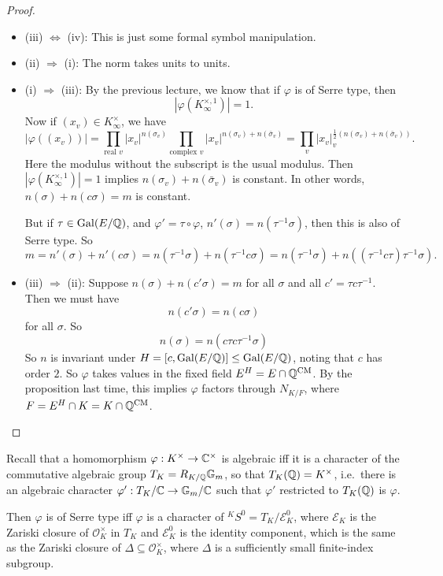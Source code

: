 \documentclass[a4paper]{article}
\renewcommand\G{\mathbb{G}}
\newcommand\CM{\mathrm{CM}}
\begin{document}
\begin{proof}\leavevmode
  \begin{itemize}
    \item (iii) $\Leftrightarrow$ (iv): This is just some formal symbol manipulation.
    \item (ii) $\Rightarrow$ (i): The norm takes units to units.
    \item (i) $\Rightarrow$ (iii): By the previous lecture, we know that if $\varphi$ is of Serre type, then
      \[
        |\varphi(K_\infty^{\times, 1})| = 1.
      \]
      Now if $(x_v) \in K_\infty^\times$, we have
      \[
        |\varphi((x_v))| = \prod_{\text{real }v} |x_v|^{n(\sigma_v)} \prod_{\text{complex }v} |x_v|^{n(\sigma_v) + n(\bar{\sigma}_v)} = \prod_v |x_v|_v^{\frac{1}{2} (n(\sigma_v) + n(\bar{\sigma}_v))}.
      \]
      Here the modulus without the subscript is the usual modulus. Then $|\varphi(K_\infty^{\times, 1})| = 1$ implies $n(\sigma_v) + n(\bar{\sigma}_v)$ is constant. In other words, $n(\sigma) + n(c\sigma) = m$ is constant.

      But if $\tau \in \operatorname{Gal}(E/\mathbb{Q})$, and $\varphi' = \tau \circ \varphi$, $n'(\sigma) = n(\tau^{-1}\sigma)$, then this is also of Serre type. So
      \[
        m = n'(\sigma) + n'(c\sigma) = n(\tau^{-1} \sigma) + n(\tau^{-1} c \sigma) = n(\tau^{-1} \sigma) + n((\tau^{-1} c \tau) \tau^{-1} \sigma).
      \]
    \item (iii) $\Rightarrow$ (ii): Suppose $n(\sigma) + n(c'\sigma) = m$ for all $\sigma$ and all $c' = \tau c \tau^{-1}$. Then we must have
      \[
        n(c'\sigma) = n(c\sigma)
      \]
      for all $\sigma$. So
      \[
        n(\sigma) = n(c\tau c \tau^{-1} \sigma)
      \]
      So $n$ is invariant under $H = [c, \operatorname{Gal}(E/\mathbb{Q})] \leq \operatorname{Gal}(E/\mathbb{Q})$, noting that $c$ has order $2$. So $\varphi$ takes values in the fixed field $E^H = E \cap \Q^{\CM}$. By the proposition last time, this implies $\varphi$ factors through $N_{K/F}$, where $F = E^H \cap K = K \cap \Q^{\CM}$.\qedhere
  \end{itemize}
\end{proof}
Recall that a homomorphism $\varphi: K^\times \to \mathbb{C}^\times$ is algebraic iff it is a character of the commutative algebraic group $T_K = R_{K/\Q} \G_m$, so that $T_K(\mathbb{Q}) = K^\times$, i.e.\ there is an algebraic character $\varphi': T_K/\C \to \G_m/\C$ such that $\varphi'$ restricted to $T_K(\mathbb{Q})$ is $\varphi$.

Then $\varphi$ is of Serre type iff $\varphi$ is a character of $^KS^0 = T_K/\mathcal{E}_K^0$, where $\mathcal{E}_K$ is the Zariski closure of $\mathcal{O}_K^\times$ in $T_K$ and $\mathcal{E}_K^0$ is the identity component, which is the same as the Zariski closure of $\Delta \subseteq \mathcal{O}_K^\times$, where $\Delta$ is a sufficiently small finite-index subgroup.
\end{document}
